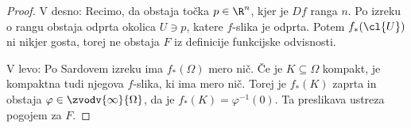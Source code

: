 \begin{proof}
  V desno:
  Recimo, da obstaja točka $p \in \R^n$, kjer je $Df$ ranga $n$.
  Po izreku o rangu obstaja odprta okolica $U \ni p$, katere $f$-slika je
  odprta.
  Potem $f_*(\cl{U})$ ni nikjer gosta, torej ne obstaja $F$ iz definicije
  funkcijske odvisnosti.

  V levo:
  Po Sardovem izreku ima $f_*(\Omega)$ mero nič.
  Če je $K \subseteq \Omega$ kompakt, je kompaktna tudi njegova $f$-slika, ki
  ima mero nič.
  Torej je $f_*(K)$ zaprta in obstaja $\varphi \in \zvodv{\infty}{\Omega}$, da
  je $f_*(K) = \varphi^{-1}(0)$.
  Ta preslikava ustreza pogojem za $F$.
\end{proof}


